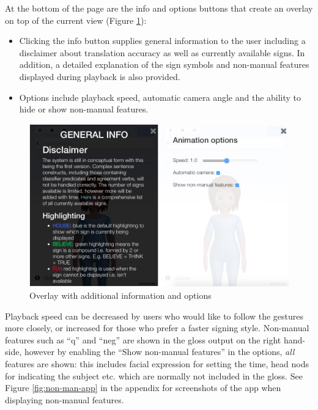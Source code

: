 \documentclass[12pt]{ociamthesis}  %
\begin{document}
At the bottom of the page are the info and options buttons that create an overlay on top of the current view (Figure \ref{fig:info-option}):
\begin{itemize}
	\item Clicking the info button supplies general information to the user including a disclaimer about translation accuracy as well as currently available signs. In addition, a detailed explanation of the sign symbols and non-manual features displayed during playback is also provided.
	\item Options include playback speed, automatic camera angle and the ability to hide or show non-manual features. 
\end{itemize}
\begin{figure}[H]
	\centering
    \includegraphics[scale=0.33]{chapter3/info-option}
    \caption{Overlay with additional information and options}
    \label{fig:info-option}
\end{figure}
Playback speed can be decreased by users who would like to follow the gestures more closely, or increased for those who prefer a faster signing style. Non-manual features such as ``q'' and ``neg'' are shown in the gloss output on the right hand-side, however by enabling the ``Show non-manual features'' in the options, \textit{all} features are shown: this includes facial expression for setting the time, head nods for indicating the subject etc. which are normally not included in the gloss. See Figure \ref{fig:non-man-app} in the appendix for screenshots of the app when displaying non-manual features.
\end{document}
